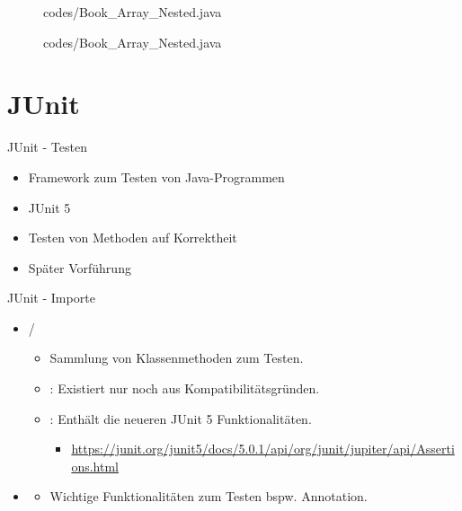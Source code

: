 \documentclass{../tuda-beamer}
\begin{document}
  \begin{frame}[c]
    \begin{figure}[h]
      \centering
      
      {codes/Book_Array_Nested.java}
    \end{figure}
  \end{frame}

  \begin{frame}[c]
    \begin{figure}[h]
      \centering
      
      {codes/Book_Array_Nested.java}
    \end{figure}
  \end{frame}


  \section{JUnit}
  \begin{frame}{JUnit - Testen}
    \begin{itemize}
      \item Framework zum Testen von Java-Programmen
      \item JUnit 5
      \item Testen von Methoden auf Korrektheit
      \item Später Vorführung
    \end{itemize}
  \end{frame}

  \begin{frame}{JUnit - Importe}
    \begin{itemize}
      \item {}/ 
      \begin{itemize}
        \item Sammlung von Klassenmethoden zum Testen.
        \item {}: Existiert nur noch aus Kompatibilitätsgründen.
        \item {}: Enthält die neueren JUnit 5 Funktionalitäten.
        \begin{itemize}
          \item \url{https://junit.org/junit5/docs/5.0.1/api/org/junit/jupiter/api/Assertions.html}
        \end{itemize}
      \end{itemize}
      \item {}
      \begin{itemize}
        \item Wichtige Funktionalitäten zum Testen bspw.  Annotation.
      \end{itemize}
    \end{itemize}
  \end{frame}
\end{document}

